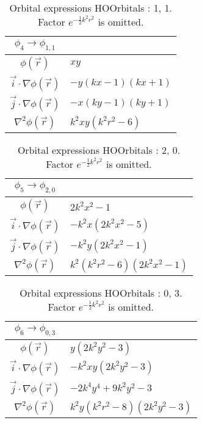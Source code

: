 \begin{table}
\begin{center}
\begin{tabular}{c|l}
$\phi_{4} \rightarrow \phi_{1, 1}$\\
\hline
$\phi(\vec r)$ & $x y$\\
\hline
$\vec i\cdot \nabla \phi(\vec r)$ & $- y \left(k x -1\right) \left(k x + 1\right)$\\
$\vec j\cdot \nabla \phi(\vec r)$ & $- x \left(k y -1\right) \left(k y + 1\right)$\\
\hline
$\nabla^2 \phi(\vec r)$ & $k^{2} x y \left(k^{2} r^{2} -6\right)$\\
\end{tabular}
\caption{Orbital expressions HOOrbitals : 1, 1. Factor $e^{- \frac{1}{2} k^{2} r^{2}}$ is omitted.}
\end{center}
\end{table}

\clearpage

\begin{table}
\begin{center}
\begin{tabular}{c|l}
$\phi_{5} \rightarrow \phi_{2, 0}$\\
\hline
$\phi(\vec r)$ & $2 k^{2} x^{2} -1$\\
\hline
$\vec i\cdot \nabla \phi(\vec r)$ & $- k^{2} x \left(2 k^{2} x^{2} -5\right)$\\
$\vec j\cdot \nabla \phi(\vec r)$ & $- k^{2} y \left(2 k^{2} x^{2} -1\right)$\\
\hline
$\nabla^2 \phi(\vec r)$ & $k^{2} \left(k^{2} r^{2} -6\right) \left(2 k^{2} x^{2} -1\right)$\\
\end{tabular}
\caption{Orbital expressions HOOrbitals : 2, 0. Factor $e^{- \frac{1}{2} k^{2} r^{2}}$ is omitted.}
\end{center}
\end{table}


\begin{table}
\begin{center}
\begin{tabular}{c|l}
$\phi_{6} \rightarrow \phi_{0, 3}$\\
\hline
$\phi(\vec r)$ & $y \left(2 k^{2} y^{2} -3\right)$\\
\hline
$\vec i\cdot \nabla \phi(\vec r)$ & $- k^{2} x y \left(2 k^{2} y^{2} -3\right)$\\
$\vec j\cdot \nabla \phi(\vec r)$ & $- 2 k^{4} y^{4} + 9 k^{2} y^{2} -3$\\
\hline
$\nabla^2 \phi(\vec r)$ & $k^{2} y \left(k^{2} r^{2} -8\right) \left(2 k^{2} y^{2} -3\right)$\\
\end{tabular}
\caption{Orbital expressions HOOrbitals : 0, 3. Factor $e^{- \frac{1}{2} k^{2} r^{2}}$ is omitted.}
\end{center}
\end{table}


